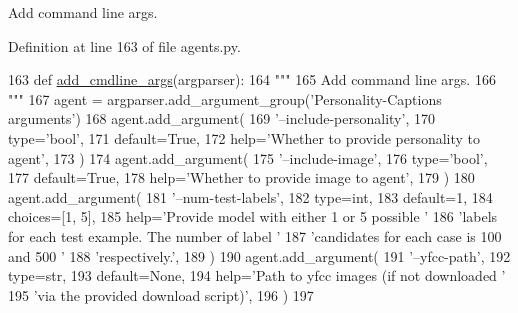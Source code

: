 \begin{DoxyVerb}Add command line args.
\end{DoxyVerb}
 

Definition at line 163 of file agents.\+py.


\begin{DoxyCode}
163     \textcolor{keyword}{def }\hyperlink{namespaceparlai_1_1agents_1_1drqa_1_1config_a62fdd5554f1da6be0cba185271058320}{add\_cmdline\_args}(argparser):
164         \textcolor{stringliteral}{"""}
165 \textcolor{stringliteral}{        Add command line args.}
166 \textcolor{stringliteral}{        """}
167         agent = argparser.add\_argument\_group(\textcolor{stringliteral}{'Personality-Captions arguments'})
168         agent.add\_argument(
169             \textcolor{stringliteral}{'--include-personality'},
170             type=\textcolor{stringliteral}{'bool'},
171             default=\textcolor{keyword}{True},
172             help=\textcolor{stringliteral}{'Whether to provide personality to agent'},
173         )
174         agent.add\_argument(
175             \textcolor{stringliteral}{'--include-image'},
176             type=\textcolor{stringliteral}{'bool'},
177             default=\textcolor{keyword}{True},
178             help=\textcolor{stringliteral}{'Whether to provide image to agent'},
179         )
180         agent.add\_argument(
181             \textcolor{stringliteral}{'--num-test-labels'},
182             type=int,
183             default=1,
184             choices=[1, 5],
185             help=\textcolor{stringliteral}{'Provide model with either 1 or 5 possible '}
186             \textcolor{stringliteral}{'labels for each test example. The number of label '}
187             \textcolor{stringliteral}{'candidates for each case is 100 and 500 '}
188             \textcolor{stringliteral}{'respectively.'},
189         )
190         agent.add\_argument(
191             \textcolor{stringliteral}{'--yfcc-path'},
192             type=str,
193             default=\textcolor{keywordtype}{None},
194             help=\textcolor{stringliteral}{'Path to yfcc images (if not downloaded '}
195             \textcolor{stringliteral}{'via the provided download script)'},
196         )
197 
\end{DoxyCode}
\mbox{\label{classparlai_1_1tasks_1_1personality__captions_1_1agents_1_1PersonalityCaptionsTeacher_a2f146ae93a6b1f19e570ef7aa8950c1b}} 
